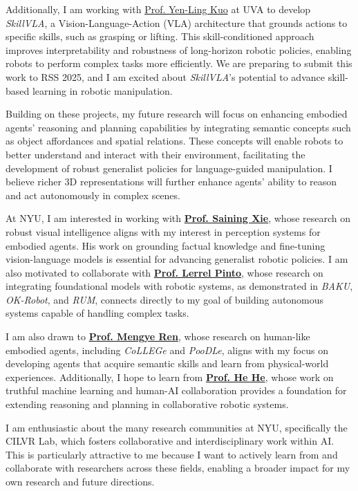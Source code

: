 \documentclass[11pt]{article}
\begin{document}
Additionally, I am working with \href{https://yenlingkuo.com/}{Prof. Yen-Ling Kuo} at UVA to develop \textit{SkillVLA}, a Vision-Language-Action (VLA) architecture that grounds actions to specific skills, such as grasping or lifting. This skill-conditioned approach improves interpretability and robustness of long-horizon robotic policies, enabling robots to perform complex tasks more efficiently. We are preparing to submit this work to RSS 2025, and I am excited about \textit{SkillVLA}'s potential to advance skill-based learning in robotic manipulation.

Building on these projects, my future research will focus on enhancing embodied agents' reasoning and planning capabilities by integrating semantic concepts such as object affordances and spatial relations. These concepts will enable robots to better understand and interact with their environment, facilitating the development of robust generalist policies for language-guided manipulation. I believe richer 3D representations will further enhance agents' ability to reason and act autonomously in complex scenes.

At NYU, I am interested in working with \href{https://www.sainingxie.com/}{\textbf{Prof. Saining Xie}}, whose research on robust visual intelligence aligns with my interest in perception systems for embodied agents. His work on grounding factual knowledge and fine-tuning vision-language models is essential for advancing generalist robotic policies. I am also motivated to collaborate with \href{https://www.lerrelpinto.com/}{\textbf{Prof. Lerrel Pinto}}, whose research on integrating foundational models with robotic systems, as demonstrated in \textit{BAKU}, \textit{OK-Robot}, and \textit{RUM}, connects directly to my goal of building autonomous systems capable of handling complex tasks.

I am also drawn to \href{https://mengyeren.com/}{\textbf{Prof. Mengye Ren}}, whose research on human-like embodied agents, including \textit{CoLLEGe} and \textit{PooDLe}, aligns with my focus on developing agents that acquire semantic skills and learn from physical-world experiences. Additionally, I hope to learn from \href{https://hhexiy.github.io/}{\textbf{Prof. He He}}, whose work on truthful machine learning and human-AI collaboration provides a foundation for extending reasoning and planning in collaborative robotic systems.

I am enthusiastic about the many research communities at NYU, specifically the CILVR Lab, which fosters collaborative and interdisciplinary work within AI. This is particularly attractive to me because I want to actively learn from and collaborate with researchers across these fields, enabling a broader impact for my own research and future directions.
\end{document}

